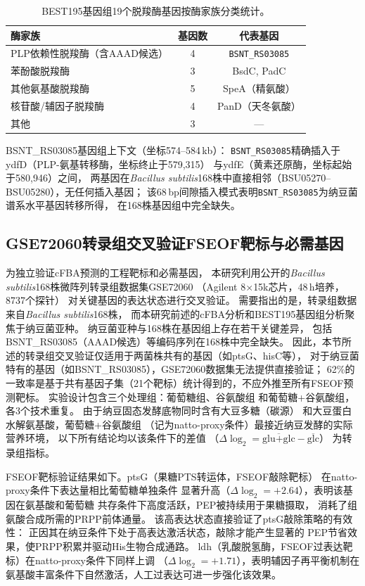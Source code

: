 \documentclass[10pt, a4paper, twocolumn]{ctexart}
\newcommand{\bs}{\textit{Bacillus subtilis}}
\begin{document}
\begin{table}[!ht]
\caption{BEST195基因组19个脱羧酶基因按酶家族分类统计。}
\label{tab:decarboxylase}
\small\centering
\begin{tabular}{lcc}
\toprule
\textbf{酶家族} & \textbf{基因数} & \textbf{代表基因} \\
\midrule
PLP依赖性脱羧酶（含AAAD候选） & 4 & \texttt{BSNT\_RS03085} \\
苯酚酸脱羧酶 & 3 & BsdC, PadC \\
其他氨基酸脱羧酶 & 5 & SpeA（精氨酸） \\
核苷酸/辅因子脱羧酶 & 4 & PanD（天冬氨酸） \\
其他 & 3 & — \\
\bottomrule
\end{tabular}
\end{table}

BSNT\_RS03085基因组上下文（坐标574--584\,kb）：
\texttt{BSNT\_RS03085}精确插入于ydfD（PLP-氨基转移酶，坐标终止于579,315）
与ydfE（黄素还原酶，坐标起始于580,946）之间，
两基因在\bs{}168株中直接相邻（BSU05270--BSU05280），无任何插入基因；
该68\,bp间隙插入模式表明\texttt{BSNT\_RS03085}为纳豆菌谱系水平基因转移所得，
在168株基因组中完全缺失。

\subsection{GSE72060转录组交叉验证FSEOF靶标与必需基因}

为独立验证cFBA预测的工程靶标和必需基因，
本研究利用公开的\bs{}168株微阵列转录组数据集GSE72060
（Agilent 8$\times$15k芯片，48\,h培养，8737个探针）
对关键基因的表达状态进行交叉验证。
需要指出的是，转录组数据来自\bs{}168株，
而本研究前述的cFBA分析和BEST195基因组分析聚焦于纳豆菌亚种。
纳豆菌亚种与168株在基因组上存在若干关键差异，
包括BSNT\_RS03085（AAAD候选）等编码序列在168株中完全缺失。
因此，本节所述的转录组交叉验证仅适用于两菌株共有的基因（如ptsG、hisC等），
对于纳豆菌特有的基因（如BSNT\_RS03085），GSE72060数据集无法提供直接验证；
62\%的一致率是基于共有基因子集（21个靶标）统计得到的，不应外推至所有FSEOF预测靶标。
实验设计包含三个处理组：葡萄糖组、谷氨酸组
和葡萄糖+谷氨酸组，各3个技术重复。
由于纳豆固态发酵底物同时含有大豆多糖（碳源）
和大豆蛋白水解氨基酸，葡萄糖+谷氨酸组
（记为natto-proxy条件）最接近纳豆发酵的实际营养环境，
以下所有结论均以该条件下的差值
（$\Delta\log_2 = \overline{\text{glu+glc}} - \overline{\text{glc}}$）
为转录组指标。

FSEOF靶标验证结果如下。ptsG（果糖PTS转运体，FSEOF敲除靶标）
在natto-proxy条件下表达量相比葡萄糖单独条件
显著升高（$\Delta\log_2 = +2.64$），表明该基因在氨基酸和葡萄糖
共存条件下高度活跃，PEP被持续用于果糖摄取，
消耗了组氨酸合成所需的PRPP前体通量。
该高表达状态直接验证了ptsG敲除策略的有效性：
正因其在纳豆条件下处于高表达激活状态，敲除才能产生显著的
PEP节省效果，使PRPP积累并驱动His生物合成通路。
ldh（乳酸脱氢酶，FSEOF过表达靶标）在natto-proxy条件下同样上调
（$\Delta\log_2 = +1.71$），表明辅因子再平衡机制在
氨基酸丰富条件下自然激活，人工过表达可进一步强化该效果。
\end{document}

